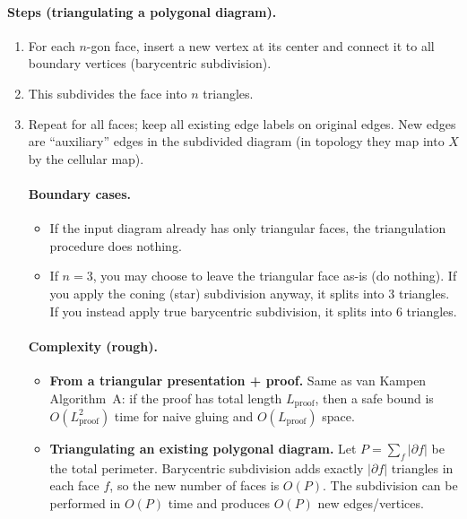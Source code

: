 \documentclass[11pt]{article}
\theoremstyle{definition}
\theoremstyle{plain}
\theoremstyle{remark}
\begin{document}
\paragraph{Steps (triangulating a polygonal diagram).}
\begin{enumerate}[leftmargin=2.2em]
\item For each $n$-gon face, insert a new vertex at its center and connect it to all boundary vertices (barycentric subdivision).
\item This subdivides the face into $n$ triangles.
\item Repeat for all faces; keep all existing edge labels on original edges.
New edges are ``auxiliary'' edges in the subdivided diagram (in topology they map into $X$ by the cellular map).


\paragraph{Boundary cases.}
\begin{itemize}[leftmargin=2em]
\item If the input diagram already has only triangular faces, the triangulation procedure does nothing.
\item If $n=3$, you may choose to leave the triangular face as-is (do nothing). If you apply the coning (star) subdivision anyway, it splits into 3 triangles. If you instead apply true barycentric subdivision, it splits into 6 triangles.
\end{itemize}

\paragraph{Complexity (rough).}\cite{hatcher2002}
\begin{itemize}[leftmargin=2em]
\item \textbf{From a triangular presentation + proof.} Same as van Kampen Algorithm~A: if the proof has total length $L_{\mathrm{proof}}$, then a safe bound is $O(L_{\mathrm{proof}}^2)$ time for naive gluing and $O(L_{\mathrm{proof}})$ space.
\item \textbf{Triangulating an existing polygonal diagram.} Let $P=\sum_f |\partial f|$ be the total perimeter.
Barycentric subdivision adds exactly $|\partial f|$ triangles in each face $f$, so the new number of faces is $O(P)$.
The subdivision can be performed in $O(P)$ time and produces $O(P)$ new edges/vertices.
\end{itemize}
\end{enumerate}
\end{document}
